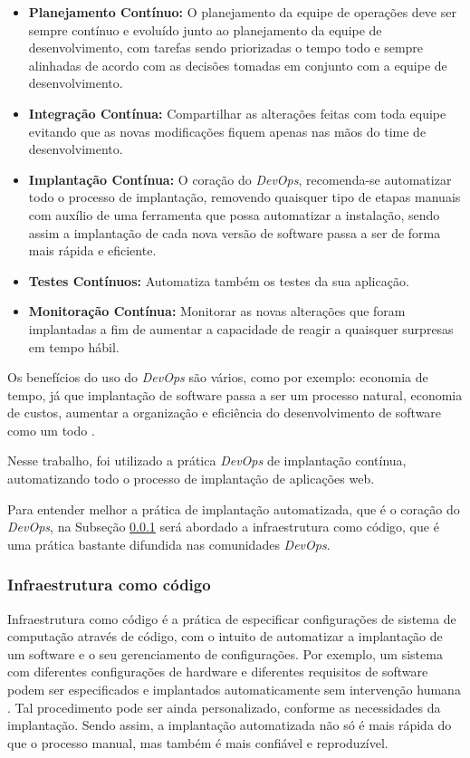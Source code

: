  \begin{itemize}
   \item \textbf{Planejamento Contínuo:} O planejamento da equipe de operações 
deve ser sempre contínuo
   e evoluído junto ao planejamento da equipe de desenvolvimento, com tarefas
   sendo priorizadas o tempo todo e sempre alinhadas de acordo com as decisões tomadas
   em conjunto com a equipe de desenvolvimento.
   \item \textbf{Integração Contínua:} Compartilhar as alterações feitas com toda equipe
   evitando que as novas modificações fiquem apenas nas mãos do time de desenvolvimento.
   \item \textbf{Implantação Contínua:} O coração do \textit{DevOps}, recomenda-se automatizar
   todo o processo de implantação, removendo quaisquer tipo de etapas manuais com auxílio
   de uma ferramenta que possa automatizar a instalação, sendo assim a implantação
   de cada nova versão de software passa a ser de forma mais rápida e eficiente.
   \item \textbf{Testes Contínuos:} Automatiza também os testes da sua aplicação.
   \item \textbf{Monitoração Contínua:} Monitorar as novas alterações
   que foram implantadas a fim de aumentar a capacidade de reagir a quaisquer surpresas
   em tempo hábil.
 \end{itemize}

 Os benefícios do uso do \textit{DevOps} são vários, como por exemplo: economia de tempo,
 já que implantação de software passa a ser um processo natural, economia de custos, aumentar
 a organização e eficiência do desenvolvimento de software como um todo \cite{7173368}.

Nesse trabalho, foi utilizado a prática \textit{DevOps} de implantação contínua,
automatizando todo o processo de implantação de aplicações web. 

Para entender melhor a prática de implantação automatizada, que é o coração
do \textit{DevOps}, na Subseção \ref{subsub:infracode} será abordado a infraestrutura
como código, que é uma prática bastante difundida nas comunidades \textit{DevOps}.

\subsubsection{Infraestrutura como código}
\label{subsub:infracode}
Infraestrutura como código é a prática de especificar configurações de
sistema de computação através de código, com o intuito de automatizar a implantação
de um software e o seu gerenciamento de configurações. Por exemplo, um sistema
com diferentes configurações de hardware e diferentes
requisitos de software podem ser especificados e implantados automaticamente
sem intervenção humana \cite{configurationcodesmell}. Tal procedimento pode ser
ainda personalizado, conforme as necessidades da implantação. Sendo assim, a implantação
automatizada não só é mais rápida do que o processo manual, mas também é mais
confiável e reproduzível.

